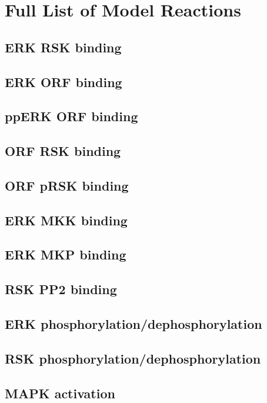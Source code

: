 \documentclass[12pt]{article}
\begin{document}
	\section{Full List of Model Reactions}
	\label{s:reactions}
	\begin{footnotesize}
		\subsection*{ERK RSK binding}
		
		\subsection*{ERK ORF binding}
		
		\subsection*{ppERK ORF binding}
		
		\subsection*{ORF RSK binding}
		
		\subsection*{ORF pRSK binding}
		
		\subsection*{ERK MKK binding}
		
		\subsection*{ERK MKP binding}
		
		\subsection*{RSK PP2 binding}
			
		\subsection*{ERK phosphorylation/dephosphorylation}
		
		\subsection*{RSK phosphorylation/dephosphorylation}
		
		\subsection*{MAPK activation}
		
	\end{footnotesize}
	
\end{document}
